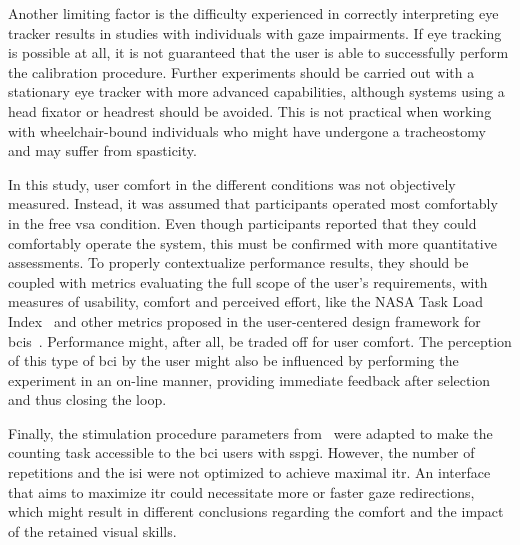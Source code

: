 \documentclass[twocolumn]{article}
\begin{document}
Another limiting factor is the difficulty experienced in correctly interpreting eye
tracker results in studies with individuals with gaze impairments.
If eye tracking is possible at all, it is not guaranteed that the user is able
to successfully perform the calibration procedure.
Further experiments should be carried out with a stationary eye tracker with
more advanced capabilities, although systems using a head fixator or headrest
should be avoided.
This is not practical when working with
wheelchair-bound individuals who might have undergone a tracheostomy and may
suffer from spasticity.

In this study, user comfort in the different conditions was not objectively
measured.
Instead, it was assumed that participants operated most comfortably in the free
\ac{vsa} condition.
Even though participants reported that they could comfortably operate the
system, this must be confirmed with more quantitative assessments.
To properly contextualize performance results, they should be coupled with
metrics evaluating the full scope of the user's requirements, with measures of
usability, comfort and perceived effort, like the NASA Task Load
Index~\cite{Hart2006} and other metrics proposed in the user-centered design
framework for \acp{bci}~\cite{Kuebler2014}.
Performance might, after all, be traded off for user comfort.
The perception of this type of \ac{bci} by the user might also be influenced by
performing the experiment in an on-line manner, providing immediate feedback
after selection and thus closing the loop.

Finally, the stimulation procedure parameters
from~\textcite{VanDenKerchove2024} were adapted to make the counting task
accessible to the \ac{bci} users with \ac{sspgi}.
However, the number of repetitions and the \ac{isi} were not optimized to achieve
maximal \ac{itr}.
An interface that aims to maximize \ac{itr} could necessitate more or faster
gaze redirections, which might result in different conclusions regarding the
comfort and the impact of the retained visual skills.

\acresetall
\end{document}
